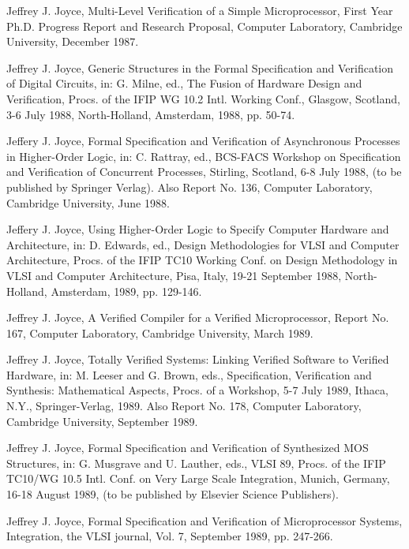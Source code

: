 \begin{thebibliography}{99}
Jeffrey J. Joyce,
Multi-Level Verification of a Simple Microprocessor,
First Year Ph.D. Progress Report and Research Proposal,
Computer Laboratory,
Cambridge University,
December 1987.

Jeffrey J. Joyce,
Generic Structures in the Formal Specification and
Verification of Digital Circuits, in:
G. Milne, ed.,
The Fusion of Hardware Design and Verification,
Procs. of the IFIP WG 10.2 Intl. Working Conf.,
Glasgow, Scotland, 3-6 July 1988,
North-Holland, Amsterdam, 1988,
pp. 50-74.

Jeffery J. Joyce,
Formal Specification and Verification of Asynchronous Processes
in Higher-Order Logic, in:
C. Rattray, ed.,
BCS-FACS Workshop on Specification and Verification of Concurrent Processes,
Stirling, Scotland, 6-8 July 1988,
(to be published by Springer Verlag).
Also Report No. 136, Computer Laboratory, Cambridge University,
June 1988.

Jeffery J. Joyce,
Using Higher-Order Logic to Specify Computer Hardware and Architecture, in:
D. Edwards, ed.,
Design Methodologies for VLSI and Computer Architecture,
Procs. of the IFIP TC10 Working Conf. on
Design Methodology in VLSI and Computer Architecture,
Pisa, Italy, 19-21 September 1988,
North-Holland, Amsterdam, 1989,
pp. 129-146.

Jeffrey J. Joyce,
A Verified Compiler for a Verified Microprocessor,
Report No. 167, Computer Laboratory, Cambridge University,
March 1989.

Jeffrey J. Joyce,
Totally Verified Systems: Linking Verified Software to Verified Hardware, in:
M. Leeser and G. Brown, eds.,
Specification, Verification and Synthesis:
Mathematical Aspects,
Procs. of a Workshop, 5-7 July 1989,
Ithaca, N.Y.,
Springer-Verlag,
1989.
Also Report No. 178, Computer Laboratory, Cambridge University,
September 1989.

Jeffrey J. Joyce,
Formal Specification and Verification of Synthesized MOS Structures, in:
G. Musgrave and U. Lauther, eds.,
VLSI 89,
Procs. of the IFIP TC10/WG 10.5 Intl. Conf. on Very Large Scale Integration,
Munich, Germany, 16-18 August 1989,
(to be published by Elsevier Science Publishers).

Jeffrey J. Joyce,
Formal Specification and Verification of Microprocessor Systems,
Integration, the VLSI journal, Vol. 7,
September 1989,
pp. 247-266.


\end{thebibliography}

